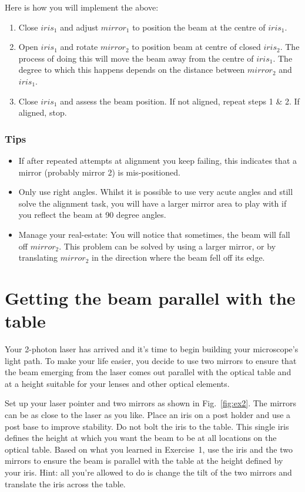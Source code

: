 \documentclass[a4paper]{report}
\begin{document}
Here is how you will implement the above:

\begin{enumerate}
\item Close $iris_1$ and adjust $mirror_1$ to position the beam at the centre of $iris_1$.
\item Open $iris_1$ and rotate $mirror_2$ to position beam at centre of closed $iris_2$. 
The process of doing this will move the beam away from the centre of $iris_1$. 
The degree to which this happens depends on the distance between $mirror_2$ and $iris_1$.
\item Close $iris_1$ and assess the beam position. If not aligned, repeat steps 1 \& 2. 
If aligned, stop. 
\end{enumerate}

\subsubsection{Tips}
\begin{itemize}

\item If after repeated attempts at alignment you keep failing, this indicates that a mirror (probably mirror 2) is mis-positioned. 
\item Only use right angles. 
Whilst it is possible to use very acute angles and still solve the alignment task, you will have a larger mirror area to play with if you reflect the beam at 90 degree angles.
\item Manage your real-estate: You will notice that sometimes, the beam will fall off $mirror_2$. This problem can be solved by using a larger mirror, or by translating $mirror_2$ in the direction where the beam fell off its edge.
\end{itemize}


\section{Getting the beam parallel with the table}
Your 2-photon laser has arrived and it's time to begin building your microscope's light path. 
To make your life easier, you decide to use two mirrors to ensure that the beam emerging from the laser comes out parallel with the optical table and at a height suitable for your lenses and other optical elements. 


Set up your laser pointer and two mirrors as shown in Fig.~\ref{fig:ex2}. 
The mirrors can be as close to the laser as you like. 
Place an iris on a post holder and use a post base to improve stability. 
Do not bolt the iris to the table.
This single iris defines the height at which you want the beam to be at all locations on the optical table. 
Based on what you learned in Exercise~1, use the iris and the two mirrors to ensure the beam is parallel with the table at the height defined by your iris. 
Hint: all you're allowed to do is change the tilt of the two mirrors and translate the iris across the table.
\end{document}

